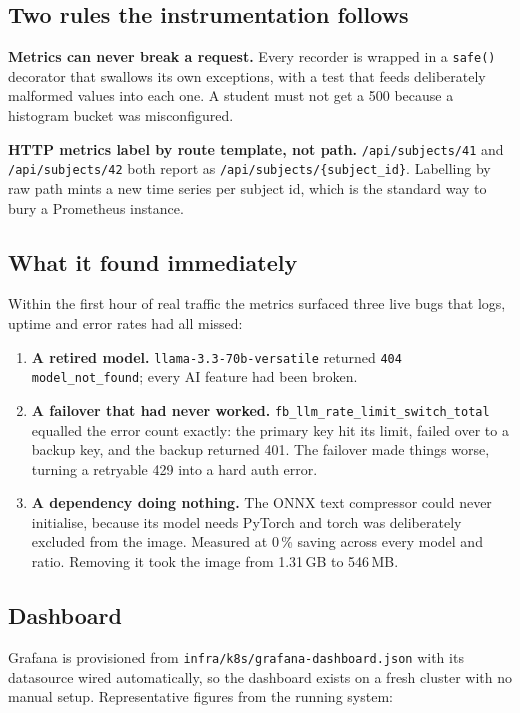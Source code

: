 \documentclass[11pt,a4paper]{article}
\newcommand{\code}[1]{\colorbox{fbCream}{\texttt{\small #1}}}
\begin{document}
\subsection{Two rules the instrumentation follows}

\textbf{Metrics can never break a request.} Every recorder is wrapped in a
\code{safe()} decorator that swallows its own exceptions, with a test that feeds
deliberately malformed values into each one. A student must not get a 500 because
a histogram bucket was misconfigured.

\textbf{HTTP metrics label by route template, not path.}
\code{/api/subjects/41} and \code{/api/subjects/42} both report as
\code{/api/subjects/\{subject\_id\}}. Labelling by raw path mints a new time
series per subject id, which is the standard way to bury a Prometheus instance.

\subsection{What it found immediately}

Within the first hour of real traffic the metrics surfaced three live bugs that
logs, uptime and error rates had all missed:

\begin{enumerate}[leftmargin=1.6em]
\item \textbf{A retired model.} \code{llama-3.3-70b-versatile} returned
  \code{404 model\_not\_found}; every AI feature had been broken.
\item \textbf{A failover that had never worked.}
  \code{fb\_llm\_rate\_limit\_switch\_total} equalled the error count exactly:
  the primary key hit its limit, failed over to a backup key, and the backup
  returned 401. The failover made things worse, turning a retryable 429 into a
  hard auth error.
\item \textbf{A dependency doing nothing.} The ONNX text compressor could never
  initialise, because its model needs PyTorch and torch was deliberately excluded
  from the image. Measured at 0\,\% saving across every model and ratio. Removing
  it took the image from 1.31\,GB to 546\,MB.
\end{enumerate}

\subsection{Dashboard}

Grafana is provisioned from \code{infra/k8s/grafana-dashboard.json} with its
datasource wired automatically, so the dashboard exists on a fresh cluster with
no manual setup. Representative figures from the running system:
\end{document}
